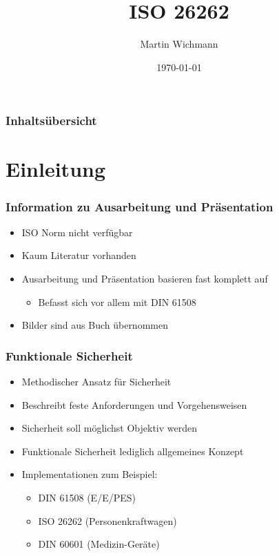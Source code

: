 \documentclass[]{beamer}
\author{Martin Wichmann}
\title{ISO 26262}
\date{\today}
\institute{Ostfalia Hochschule für angewandte Wissenschaften}
\begin{document}
\begin{frame}
\maketitle
\end{frame}


\begin{frame}
\frametitle{Inhaltsübersicht}
\tableofcontents
\end{frame}





\section{Einleitung}
\label{sec:einleitung}

\begin{frame}
\frametitle{Information zu Ausarbeitung und Präsentation}
\begin{itemize}
    \item ISO Norm nicht verfügbar
    \item Kaum Literatur vorhanden
    \item Ausarbeitung und Präsentation basieren fast komplett auf \cite{1}
    \begin{itemize}
        \item Befasst sich vor allem mit DIN 61508
    \end{itemize}
    \item Bilder sind aus Buch übernommen
\end{itemize}
\end{frame}


\begin{frame}
\frametitle{Funktionale Sicherheit}

\begin{itemize}
    \item Methodischer Ansatz für Sicherheit
    \item Beschreibt feste Anforderungen und Vorgehensweisen
    \item Sicherheit soll möglichst Objektiv werden
    \item Funktionale Sicherheit lediglich allgemeines Konzept
    \item Implementationen zum Beispiel:
    \begin{itemize}
        \item DIN 61508 (E/E/PES)
        \item ISO 26262 (Personenkraftwagen)
        \item DIN 60601 (Medizin-Geräte)
    \end{itemize}
\end{itemize}

\end{frame}
\end{document}
